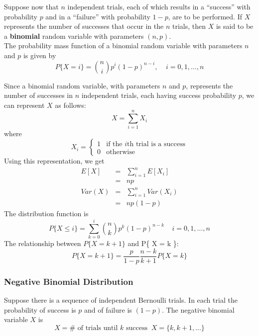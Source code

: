 \documentclass[12pt]{article}
\begin{document}
Suppose now that $n$ independent trials, each of which results in a ``success'' with probability $p$ and in a ``failure'' with probability $1-p$, are to be performed. If $X$ represents the number of successes that occur in the $n$ trials, then $X$ is said to be a \textbf{binomial} random variable with parameters $(n,p)$. \\

The probability mass function of a binomial random variable with parameters $n$ and $p$ is given by
\begin{equation*}
  P\{ X=i \} = \binom{n}{i} p^i (1-p)^{n-i}, \;\;\;\; i =0,1,\dots,n
\end{equation*}

Since a binomial random variable, with parameters $n$ and $p$, represents the number of successes in $n$ independent trials, each having success probability $p$, we can represent $X$ as follows:
\begin{equation*}
  X = \sum_{i=1}^n X_i
\end{equation*}
where
\begin{equation*}
  X_i =
  \begin{cases}
    1 & \text{if the $i$th trial is a success} \\
    0 & \text{otherwise}
  \end{cases}
\end{equation*}
Using this representation, we get
\begin{eqnarray*}
  E[X]
  &=& \sum_{i=1}^n E[X_i] \\
  &=& np \\
  Var(X)
  &=& \sum_{i=1}^n Var(X_i) \\
  &=& np(1-p)
\end{eqnarray*}
The distribution function is
\begin{equation*}
  P\{ X \le i \}
  = \sum_{k=0}^i \binom{n}{k} p^k (1-p)^{n-k} \;\;\;\; i = 0,1,\dots,n
\end{equation*}
The relationship between $P\{ X = k+1 \}$ and P\{ X = k \}:
\begin{equation*}
  P\{ X = k+1 \}
  = \frac{p}{1-p} \frac{n-k}{k+1} P\{ X = k \}
\end{equation*}

\subsubsection{Negative Binomial Distribution}

Suppose there is a sequence of independent Bernoulli trials. In each trial the probability of success is $p$ and of failure is $(1-p)$. The negative binomial variable $X$ is
\begin{equation*}
  X = \# \text{ of trials until $k$ success} \;\; X = \{k, k+1, \dots \}
\end{equation*}
\end{document}
